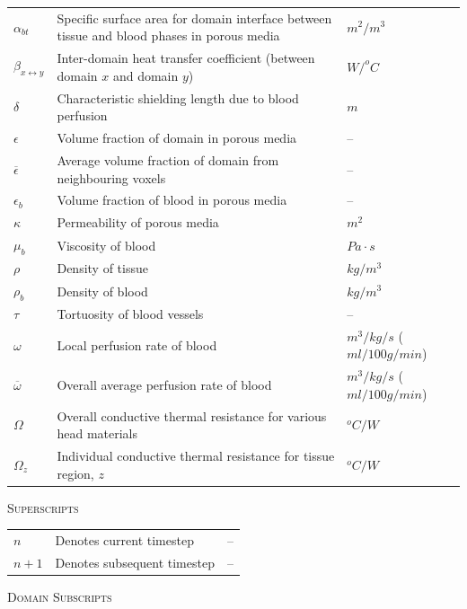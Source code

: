 \documentclass[11pt,english,a4paper,twoside,openright]{report}
\begin{document}
{{{{\begin{center}
\begin{longtable}[H]{L{0.1\textwidth} L{0.50\textwidth} R{0.15\textwidth}}
		$\alpha_{bt}$ & Specific surface area for domain interface between tissue and blood phases in porous media & $m^2/m^3$ \\ 
		$\beta_{x\leftrightarrow y}$ & Inter-domain heat transfer coefficient (between domain $x$ and domain $y$) & $W/^{o}C$ \\
		$\delta$ & Characteristic shielding length due to blood perfusion & $m$ \\
		$\epsilon$ & Volume fraction of domain in porous media & -- \\
		$\overline{\epsilon}$ & Average volume fraction of domain from neighbouring voxels & -- \\
		$\epsilon_{b}$ & Volume fraction of blood in porous media & -- \\
		$\kappa$ & Permeability of porous media & $m^2$ \\
		$\mu_{b}$ & Viscosity of blood & $Pa{\cdot}s$ \\
		$\rho$ & Density of tissue & $kg/m^3$ \\
		$\rho_{b}$ & Density of blood & $kg/m^3$ \\
		$\tau$ & Tortuosity of blood vessels & -- \\
		$\omega$ & Local perfusion rate of blood & $m^3/kg/s$ ($ml/100g/min$) \\
		$\overline{\omega}$ & Overall average perfusion rate of blood & $m^3/kg/s$ ($ml/100g/min$) \\
		$\Omega$ & Overall conductive thermal resistance for various head materials & $^{o}C/W$ \\
		$\Omega_{z}$ & Individual conductive thermal resistance for tissue region, $z$ & $^{o}C/W$ 
		
		\end{longtable}
		\end{center}
\vspace*{-\baselineskip}
	{\selectfont\textsc{Superscripts}
		\vspace*{-\baselineskip}
		\begin{center}	
			\begin{longtable}[H]{L{0.1\textwidth} L{0.50\textwidth} R{0.15\textwidth}}
				$n$ & Denotes current timestep & -- \\
				$n+1$ & Denotes subsequent timestep & -- \\
			\end{longtable}
		\end{center}	
	\vspace*{-\baselineskip}
	{\selectfont\textsc{Domain Subscripts}
		\vspace*{-\baselineskip}
	\begin{center}	
	\begin{longtable}[H]{L{0.1\textwidth} L{0.50\textwidth} R{0.15\textwidth}}
			

\end{longtable}
\end{center}}}}}}}
\end{document}

